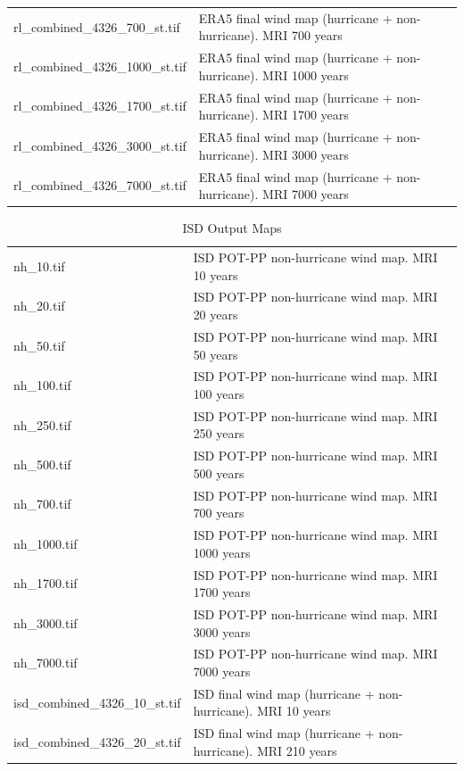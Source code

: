\documentclass[12pt,oneside]{reedthesis}
\begin{document}
\begin{longtable}[t]{>{\raggedright\arraybackslash}p{2in}>{\raggedright\arraybackslash}p{3.6in}}
rl\_combined\_4326\_700\_st.tif & ERA5 final wind map (hurricane + non-hurricane). MRI 700 years\\
rl\_combined\_4326\_1000\_st.tif & ERA5 final wind map (hurricane + non-hurricane). MRI 1000 years\\
rl\_combined\_4326\_1700\_st.tif & ERA5 final wind map (hurricane + non-hurricane). MRI 1700 years\\
rl\_combined\_4326\_3000\_st.tif & ERA5 final wind map (hurricane + non-hurricane). MRI 3000 years\\
rl\_combined\_4326\_7000\_st.tif & ERA5 final wind map (hurricane + non-hurricane). MRI 7000 years\\
\bottomrule
\end{longtable}
\endgroup{}

\begingroup\fontsize{8}{10}\selectfont
\begin{longtable}[t]{>{\raggedright\arraybackslash}p{2in}>{\raggedright\arraybackslash}p{3.5in}}
\caption[ISD Output Maps]{\label{tab:isdmaps}ISD Output Maps}\\
\toprule
\multicolumn{1}{l}{File} & \multicolumn{1}{l}{Description}\\
\midrule
nh\_10.tif & ISD POT-PP non-hurricane wind map. MRI 10 years\\
nh\_20.tif & ISD POT-PP non-hurricane wind map. MRI 20 years\\
nh\_50.tif & ISD POT-PP non-hurricane wind map. MRI 50 years\\
nh\_100.tif & ISD POT-PP non-hurricane wind map. MRI 100 years\\
nh\_250.tif & ISD POT-PP non-hurricane wind map. MRI 250 years\\
nh\_500.tif & ISD POT-PP non-hurricane wind map. MRI 500 years\\
nh\_700.tif & ISD POT-PP non-hurricane wind map. MRI 700 years\\
nh\_1000.tif & ISD POT-PP non-hurricane wind map. MRI 1000 years\\
nh\_1700.tif & ISD POT-PP non-hurricane wind map. MRI 1700 years\\
nh\_3000.tif & ISD POT-PP non-hurricane wind map. MRI 3000 years\\
nh\_7000.tif & ISD POT-PP non-hurricane wind map. MRI 7000 years\\
isd\_combined\_4326\_10\_st.tif & ISD final wind map (hurricane + non-hurricane). MRI 10 years\\
isd\_combined\_4326\_20\_st.tif & ISD final wind map (hurricane + non-hurricane). MRI 210 years\\

\end{longtable}
\end{document}
